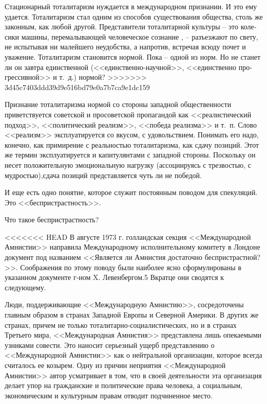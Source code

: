 \documentclass{book}
\begin{document}
{Стационарный тоталитаризм нуждается в международном признании. И это ему удается. Тоталитаризм стал одним из спо­собов существования общества, столь же законным, как лю­бой другой. Представители тоталитарной культуры -- это коле­сики машины, перемалывающей человеческое сознание , -- разъез­жают по свету, не испытывая ни малейшего неудобства, а на­против, встречая всюду почет и уважение. Тоталитаризм стано­вится нормой. Пока -- одной из норм. Но не станет ли он завт­ра единственной  (<<единственно-научной>>, <<единственно про­грессивной>> и т.~д.) нормой?
>>>>>>> 3d45c7403ddd39d9e516bd79e0a7b7ca9e1dc159

Признание тоталитаризма нормой со стороны западной об­щественности приветствуется советской и просоветской про­пагандой как <<реалистический подход>>, <<политический реа­лизм>>, <<победа реализма>> и т.~п. Слово <<реализм>> эксплуати­руется со вкусом, с удовольствием. Понимать его надо, конеч­но, как примирение с реальностью тоталитаризма, как сдачу позиций. Этот же термин эксплуатируется и капитулянтами с западной стороны. Поскольку он несет положительную эмо­циональную нагрузку (ассоциируясь с трезвостью, с мудро­стью),сдача позиций представляется чуть ли не победой.

И еще есть одно понятие, которое служит постоянным пово­дом для спекуляций. Это <<беспристрастность>>.

Что такое беспристрастность?

<<<<<<< HEAD
В августе 1973 г. голландская секция <<Международной Ам­нистии>> направила Международному исполнительному комитету в Лондоне документ под названием <<Является ли Амнистия достаточно беспристрастной?>>. Соображения по этому поводу были наиболее ясно сформулированы в указанном документе г‑ном X. Левенбергом.5 Вкратце они сводятся к следующему.

Люди, поддерживающие <<Международную Амнистию>>, сосре­доточены главным образом в странах Западной Европы и Се­верной Америки. В других же странах, причем не только тота­литарно‑социалистических, но и в странах Третьего мира, <<Международная Амнистия>> представлена лишь опекаемыми узника­ми совести. Это наносит серьезный ущерб представлению о <<Международной Амнистии>> как о нейтральной организации, которое всегда считалось ее козырем. Одну из причин непри­ятия <<Международной Амнистии>> автор усматривает в том, что в своей деятельности эта организация делает упор на граждан­ские и политические права человека, а социальным, экономи­ческим и культурным правам отводит подчиненное место.

}
\end{document}
